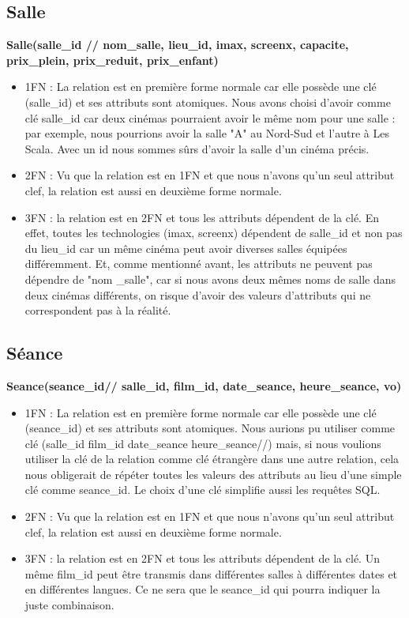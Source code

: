 \documentclass[12pt]{article}
\begin{document}
\subsection{Salle}
\textbf{Salle(salle{\_}id // nom{\_}salle, lieu{\_}id, imax, screenx, capacite, prix{\_}plein, prix{\_}reduit, prix{\_}enfant)} \\
\begin{itemize}
    \item 1FN : La relation est en première forme normale car elle 
    possède une clé (salle{\_}id) et ses attributs sont atomiques. 
    Nous avons choisi d’avoir comme clé salle{\_}id car deux cinémas 
    pourraient avoir le même nom pour une salle : par exemple, nous pourrions avoir la 
    salle "A" au Nord-Sud et l’autre à Les Scala. Avec un id nous sommes sûrs d’avoir la salle d’un cinéma précis. 
    \item 2FN : Vu que la relation est en 1FN et que nous n'avons qu'un seul attribut clef, la relation est aussi
    en deuxième forme normale.
    \item 3FN : la relation est en 2FN et tous les attributs dépendent de la clé. 
    En effet, toutes les technologies (imax, screenx) dépendent de salle{\_}id et 
    non pas du lieu{\_}id car un même cinéma peut avoir diverses salles équipées différemment. 
    Et, comme mentionné avant, les attributs ne peuvent pas dépendre de "nom {\_}salle", 
    car si nous avons deux mêmes noms de salle dans deux cinémas différents, 
    on risque d’avoir des valeurs d’attributs qui ne correspondent pas à la réalité.
\end{itemize}
\subsection{Séance}
\textbf{Seance(seance{\_}id//  salle{\_}id, film{\_}id, date{\_}seance, heure{\_}seance, vo)}
\begin{itemize}
    \item 1FN : La relation est en première forme normale car elle 
    possède une clé (seance{\_}id) et ses attributs sont atomiques. 
    Nous aurions pu utiliser comme clé (salle{\_}id film{\_}id date{\_}seance heure{\_}seance//) 
    mais, si nous voulions utiliser la clé de la relation comme clé étrangère dans une autre relation, 
    cela nous obligerait de répéter toutes les valeurs des attributs au lieu 
    d’une simple clé comme seance{\_}id. Le choix d’une clé simplifie aussi les requêtes SQL. 
    \item 2FN : Vu que la relation est en 1FN et que nous n'avons qu'un seul attribut clef, la relation est aussi
    en deuxième forme normale.
    \item 3FN : la relation est en 2FN et tous les attributs dépendent de la clé. Un même film{\_}id peut 
    être transmis dans différentes salles à différentes dates et en 
    différentes langues. Ce ne sera que le seance{\_}id qui pourra indiquer la juste combinaison. 
\end{itemize}
\pagebreak
\end{document}
